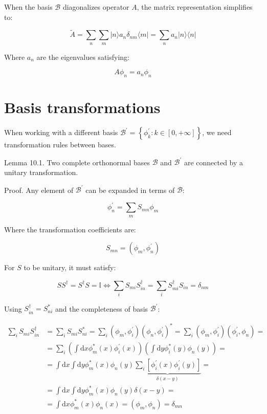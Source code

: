 When the basis $\mathcal{B}$ diagonalizes operator $A$, the matrix representation simplifies to:

\begin{equation}
\tilde{A}=\sum_{n} \sum_{m}|n\rangle a_{n} \delta_{n m}\langle m|=\sum_{n} a_{n}|n\rangle\langle n|
\end{equation}

Where $a_n$ are the eigenvalues satisfying:

\begin{equation}
A \phi_{n}=a_{n} \phi_{n}
\end{equation}

\section{Basis transformations}
When working with a different basis $\mathcal{B}^{\prime}=\left\{\phi_{k}^{\prime}: k \in[0,+\infty]\right\}$, we need transformation rules between bases.

Lemma 10.1. Two complete orthonormal bases $\mathcal{B}$ and $\mathcal{B}^{\prime}$ are connected by a unitary transformation.

Proof. Any element of $\mathcal{B}^{\prime}$ can be expanded in terms of $\mathcal{B}$:

\begin{equation}
\phi_{n}^{\prime}=\sum_{m} S_{m n} \phi_{m}
\end{equation}

Where the transformation coefficients are:

\begin{equation}
S_{m n}=\left(\phi_{m}, \phi_{n}^{\prime}\right)
\end{equation}

For $S$ to be unitary, it must satisfy:

\begin{equation}
S S^{\dagger}=S^{\dagger} S=\mathbb{I} \Longleftrightarrow \sum_{i} S_{m i} S_{i n}^{\dagger}=\sum_{i} S_{m i}^{\dagger} S_{i n}=\delta_{n m}
\end{equation}

Using $S_{i n}^{\dagger}=S_{n i}^{*}$ and the completeness of basis $\mathcal{B}^{\prime}$:

\begin{align}
\sum_{i} S_{m i} S_{i n}^{\dagger} & =\sum_{i} S_{m i} S_{n i}^{*}=\sum_{i}\left(\phi_{m}, \phi_{i}^{\prime}\right)\left(\phi_{n}, \phi_{i}^{\prime}\right)^{*}=\sum_{i}\left(\phi_{m}, \phi_{i}^{\prime}\right)\left(\phi_{i}^{\prime}, \phi_{n}\right)= \\
& =\sum_{i}\left(\int \mathrm{d} x \phi_{m}^{*}(x) \phi_{i}^{\prime}(x)\right)\left(\int \mathrm{d} y \phi_{i}^{*}(y) \phi_{n}(y)\right)= \\
& =\int \mathrm{d} x \int \mathrm{d} y \phi_{m}^{*}(x) \phi_{n}(y) \underbrace{\sum_{i}\left[\phi_{i}^{\prime}(x) \phi_{i}^{\prime}(y)\right]}_{\delta(x-y)}= \\
& =\int \mathrm{d} x \int \mathrm{d} y \phi_{m}^{*}(x) \phi_{n}(y) \delta(x-y)= \\
& =\int \mathrm{d} x \phi_{m}^{*}(x) \phi_{n}(x)=\left(\phi_{m}, \phi_{n}\right)=\delta_{m n}
\end{align}

